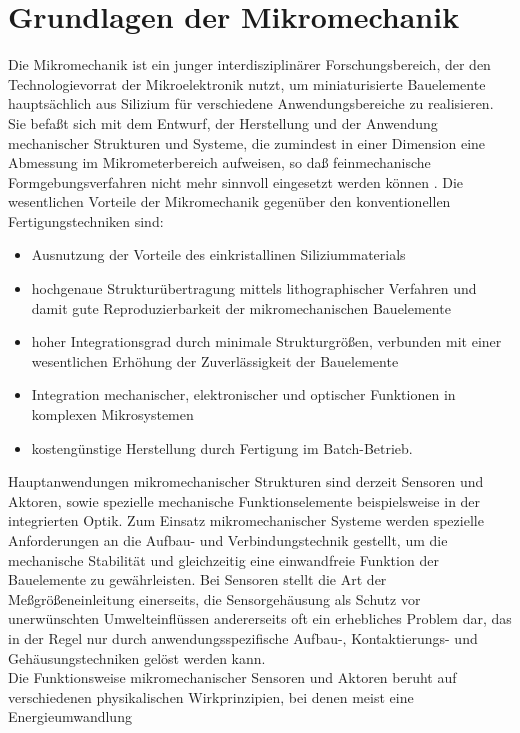 \chapter{Grundlagen der Mikromechanik}
\label{grundlagen}

Die Mikromechanik ist ein junger interdisziplinärer Forschungsbereich, der
den Technologievorrat der Mikroelektronik nutzt, um miniaturisierte
Bauelemente hauptsächlich aus Silizium für verschiedene
Anwendungsbereiche zu realisieren. Sie befaßt
sich mit dem Entwurf, der Herstellung und der Anwendung mechanischer
Strukturen und Systeme, die zumindest in einer Dimension eine Abmessung
im Mikrometerbereich aufweisen, so daß feinmechanische Formgebungsverfahren
nicht mehr sinnvoll eingesetzt werden können \cite{Bue91a}. %
Die wesentlichen Vorteile der Mikromechanik gegenüber den konventionellen
Fertigungstechniken sind:
%
\begin{itemize}
\item
Ausnutzung der Vorteile des einkristallinen Siliziummaterials
\item
hochgenaue Strukturübertragung mittels lithographischer Verfahren und damit
gute Reproduzierbarkeit der mikro\-mechanischen Bauelemente
\item
hoher Integrationsgrad durch minimale Strukturgrößen, verbunden mit
einer wesentlichen Erhöhung der Zuverlässigkeit der Bauelemente
\item
Integration mechanischer, elektronischer und optischer Funktionen
in komplexen Mikrosystemen
\item
kostengünstige Herstellung durch Fertigung im Batch-Betrieb.
\end{itemize}
%
Hauptanwendungen mikromechanischer Strukturen sind derzeit Sensoren und
Aktoren, sowie spezielle mechanische Funktionselemente beispielsweise in
der integrierten Optik.
Zum Einsatz mikromechanischer Systeme werden spezielle Anforderungen
an die Aufbau- und Verbindungstechnik gestellt, um die mechanische
Stabilität und gleichzeitig eine einwandfreie Funktion der Bauelemente zu
gewährleisten.  Bei Sensoren stellt die Art der Meßgrößeneinleitung
einerseits, die Sensorgehäusung als Schutz vor unerwünschten
Umwelteinflüssen andererseits oft ein erhebliches Problem dar, das in
der Regel nur durch anwendungsspezifische Aufbau-, Kontaktierungs-
und Gehäusungstechniken gelöst werden kann. \\
%
Die Funktionsweise
mikromechanischer Sensoren und Aktoren beruht auf verschiedenen
physikalischen Wirkprinzipien, bei denen meist eine Energieumwandlung
